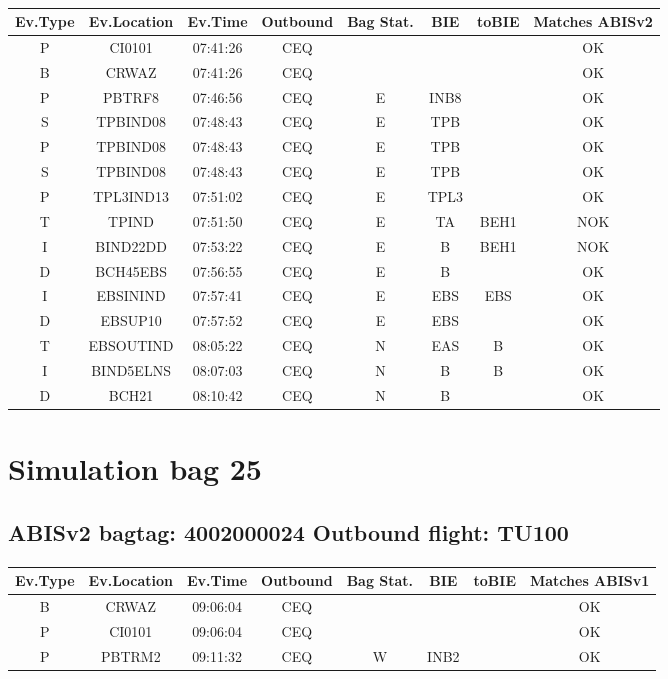 \documentclass{report}
\begin{document}
\paragraph{}
\begin{longtable}{cccccccc}    \toprule
\rowcolor{white!50}
\textbf{Ev.Type} & \textbf{Ev.Location} & \textbf{Ev.Time} & \textbf{Outbound} & \textbf{Bag Stat.} & \textbf{BIE} & \textbf{toBIE} & \textbf{Matches ABISv2} \\\midrule
P & CI0101 & 07:41:26  & CEQ &  &  &  & OK\\
B & CRWAZ & 07:41:26  & CEQ &  &  &  & OK\\
P & PBTRF8 & 07:46:56  & CEQ & E & INB8 &  & OK\\
S & TPBIND08 & 07:48:43  & CEQ & E & TPB &  & OK\\
P & TPBIND08 & 07:48:43  & CEQ & E & TPB &  & OK\\
S & TPBIND08 & 07:48:43  & CEQ & E & TPB &  & OK\\
P & TPL3IND13 & 07:51:02  & CEQ & E & TPL3 &  & OK\\
T & TPIND & 07:51:50  & CEQ & E & TA & BEH1 & NOK\\
I & BIND22DD & 07:53:22  & CEQ & E & B & BEH1 & NOK\\
D & BCH45EBS & 07:56:55  & CEQ & E & B &  & OK\\
I & EBSININD & 07:57:41  & CEQ & E & EBS & EBS & OK\\
D & EBSUP10 & 07:57:52  & CEQ & E & EBS &  & OK\\
T & EBSOUTIND & 08:05:22  & CEQ & N & EAS & B & OK\\
I & BIND5ELNS & 08:07:03  & CEQ & N & B & B & OK\\
D & BCH21 & 08:10:42  & CEQ & N & B &  & OK\\
\bottomrule
\end{longtable}
\pagebreak
\section*{Simulation bag 25}
\subsection*{ABISv2 bagtag: 4002000024 Outbound flight: TU100}
\paragraph{}
\begin{longtable}{cccccccc}    \toprule
\rowcolor{white!50}
\textbf{Ev.Type} & \textbf{Ev.Location} & \textbf{Ev.Time} & \textbf{Outbound} & \textbf{Bag Stat.} & \textbf{BIE} & \textbf{toBIE} & \textbf{Matches ABISv1} \\\midrule
B & CRWAZ & 09:06:04  & CEQ &  &  &  & OK\\
P & CI0101 & 09:06:04  & CEQ &  &  &  & OK\\
P & PBTRM2 & 09:11:32  & CEQ & W & INB2 &  & OK\\
\bottomrule
\end{longtable}
\end{document}
